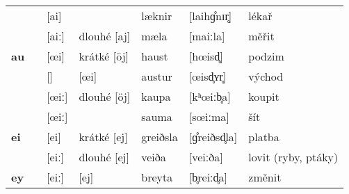 \begin{longtable}{>{\bfseries}lX>{\IPAFont}lXl>{\IPAFont}ll}
 &  & {[ai]} &  & læknir & {[laihɡ̊nɪr̥]} & lékař \\ 
 &  & {[aiː]} & dlouhé [aj] & mæla & {[maiːla]} & měřit \\ 
au &  & {[\oe i]} & krátké [öj] & haust & {[h\oe isd̥]} & podzim \\ 
 &  & {[]} & [œi] & austur & {[\oe isd̥ʏr̥]} & východ \\ 
 &  & {[\oe iː]} & dlouhé [öj] & kaupa & {[kʰ\oe iːb̥a]} & koupit \\ 
 &  & {[\oe iː]} &  & sauma & {[s\oe iːma]} & šít \\ 
ei &  & {[ei]} & krátké [ej] & greiðsla & {[ɡ̊reiðsd̥la]} & platba \\ 
 &  & {[eiː]} & dlouhé [ej] & veiða & {[veiːða]} & lovit (ryby, ptáky) \\ 
ey &  & {[eiː]} & [ej] & breyta & {[b̥reiːd̥a]} & změnit \\ 
\bottomrule
\end{longtable}
